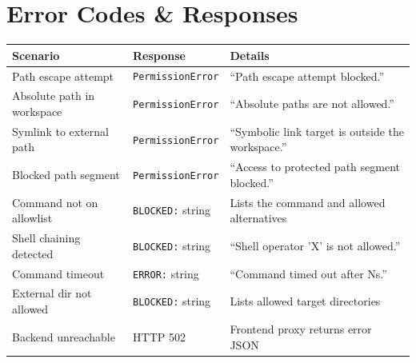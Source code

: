 \documentclass[11pt,a4paper]{article}
\begin{document}
\section{Error Codes \& Responses}

\begin{table}[h!]
\centering
\begin{tabular}{@{}llp{7cm}@{}}
\toprule
\textbf{Scenario} & \textbf{Response} & \textbf{Details} \\
\midrule
Path escape attempt & \texttt{PermissionError} & ``Path escape attempt blocked.'' \\
Absolute path in workspace & \texttt{PermissionError} & ``Absolute paths are not allowed.'' \\
Symlink to external path & \texttt{PermissionError} & ``Symbolic link target is outside the workspace.'' \\
Blocked path segment & \texttt{PermissionError} & ``Access to protected path segment blocked.'' \\
Command not on allowlist & \texttt{BLOCKED:} string & Lists the command and allowed alternatives \\
Shell chaining detected & \texttt{BLOCKED:} string & ``Shell operator 'X' is not allowed.'' \\
Command timeout & \texttt{ERROR:} string & ``Command timed out after Ns.'' \\
External dir not allowed & \texttt{BLOCKED:} string & Lists allowed target directories \\
Backend unreachable & HTTP 502 & Frontend proxy returns error JSON \\
\bottomrule
\end{tabular}
\end{table}
\end{document}
